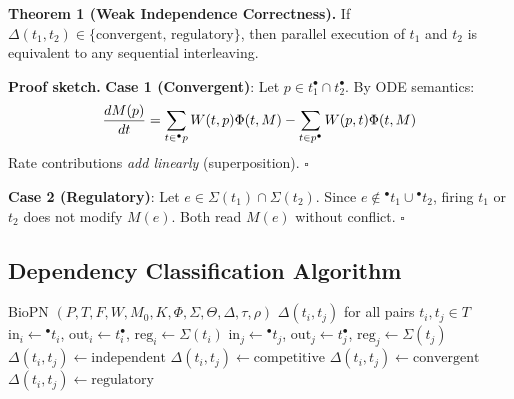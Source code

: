\documentclass[twocolumn,11pt]{article}
\newcommand{\preset}[1]{\ensuremath{{}^{\bullet}#1}}
\newcommand{\postset}[1]{\ensuremath{#1^{\bullet}}}
\newcommand{\RegSet}[1]{\ensuremath{\Sigma(#1)}}
\newcommand{\DepType}[2]{\ensuremath{\Delta(#1,#2)}}
\begin{document}
{\small
\textbf{Theorem 1 (Weak Independence Correctness).}
If $\DepType{t_1}{t_2} \in \{\text{convergent, regulatory}\}$, then parallel execution of $t_1$ and $t_2$ is equivalent to any sequential interleaving.
}

\textbf{Proof sketch.}
\textbf{Case 1 (Convergent)}: Let $p \in \postset{t_1} \cap \postset{t_2}$. By ODE semantics:
\begin{equation}
\small
\frac{dM(p)}{dt} = \sum_{t \in \preset{p}} W(t,p) \Phi(t, M) - \sum_{t \in \postset{p}} W(p,t) \Phi(t, M)
\end{equation}
Rate contributions \emph{add linearly} (superposition). $\square$

\textbf{Case 2 (Regulatory)}: Let $e \in \RegSet{t_1} \cap \RegSet{t_2}$. Since $e \notin \preset{t_1} \cup \preset{t_2}$, firing $t_1$ or $t_2$ does not modify $M(e)$. Both read $M(e)$ without conflict. $\square$

\subsection{Dependency Classification Algorithm}

\begin{algorithm}[H]
\caption{Classify Transition Dependencies}
\label{alg:classify}
\small
\begin{algorithmic}[1]
\REQUIRE BioPN $(P, T, F, W, M_0, K, \Phi, \Sigma, \Theta, \Delta, \tau, \rho)$
\ENSURE $\Delta(t_i, t_j)$ for all pairs $t_i, t_j \in T$
    \STATE $\text{in}_i \gets \preset{t_i}$, $\text{out}_i \gets \postset{t_i}$, $\text{reg}_i \gets \RegSet{t_i}$
    \STATE $\text{in}_j \gets \preset{t_j}$, $\text{out}_j \gets \postset{t_j}$, $\text{reg}_j \gets \RegSet{t_j}$
        \STATE $\Delta(t_i, t_j) \gets \text{independent}$
        \STATE $\Delta(t_i, t_j) \gets \text{competitive}$
        \STATE $\Delta(t_i, t_j) \gets \text{convergent}$
        \STATE $\Delta(t_i, t_j) \gets \text{regulatory}$
    \ENDIF
\ENDFOR
\end{algorithmic}
\end{algorithm}
\vspace{-8pt}
\end{document}
